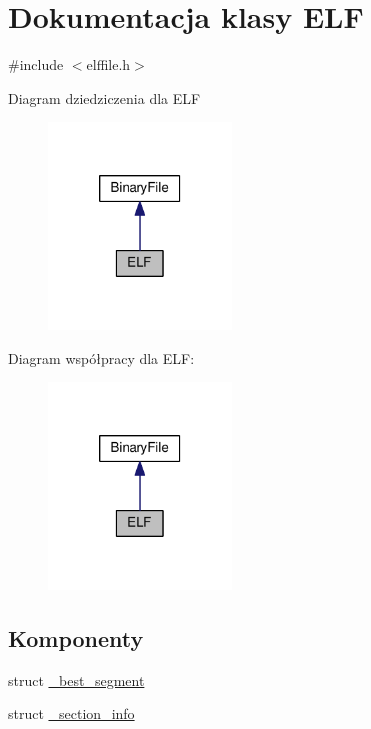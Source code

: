 \hypertarget{class_e_l_f}{\section{Dokumentacja klasy E\-L\-F}
\label{class_e_l_f}
}


{\ttfamily \#include $<$elffile.\-h$>$}



Diagram dziedziczenia dla E\-L\-F
\nopagebreak
\begin{figure}[H]
\begin{center}
\leavevmode
\includegraphics[width=138pt]{class_e_l_f__inherit__graph}
\end{center}
\end{figure}


Diagram współpracy dla E\-L\-F\-:
\nopagebreak
\begin{figure}[H]
\begin{center}
\leavevmode
\includegraphics[width=138pt]{class_e_l_f__coll__graph}
\end{center}
\end{figure}
\subsection*{Komponenty}
\begin{DoxyCompactItemize}
\item 
struct \hyperlink{struct_e_l_f_1_1__best__segment}{\-\_\-best\-\_\-segment}
\item 
struct \hyperlink{struct_e_l_f_1_1__section__info}{\-\_\-section\-\_\-info}
\end{DoxyCompactItemize}
